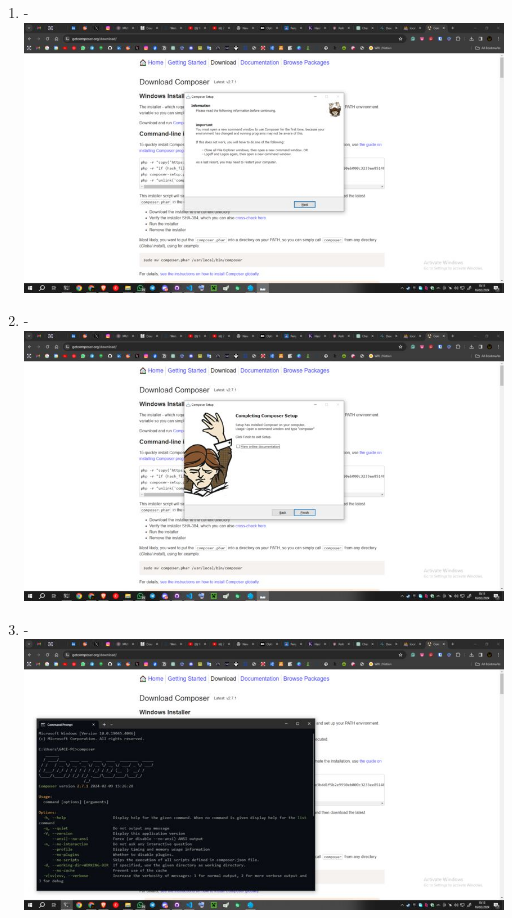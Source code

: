 \documentclass[12pt,titlepage]{article}
\begin{document}
\begin{enumerate}[label= \alph*.]
    \newpage
    \item - \\ \includegraphics[width=.9\textwidth]{images/figures/Composer 5.jpg}
    \item - \\ \includegraphics[width=.9\textwidth]{images/figures/Composer 6.jpg}
    \newpage
    \item - \\ \includegraphics[width=.9\textwidth]{images/figures/Composer 7.jpg}
\end{enumerate}

\newpage
\end{document}
